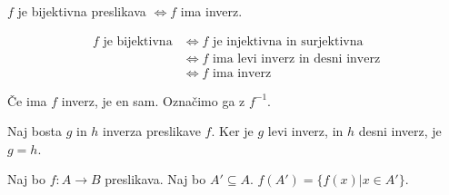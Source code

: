\begin{trditev}
    $f$ je bijektivna preslikava $\iff f$ ima inverz.
\end{trditev}
\begin{dokaz}
\begin{align*}
    f \text{ je bijektivna} &\iff f \text{ je injektivna in surjektivna} \\
    &\iff f \text{ ima levi inverz in desni inverz} \\
    &\iff f \text{ ima inverz}
\end{align*}
\end{dokaz}

\begin{trditev}
    Če ima $f$ inverz, je en sam.
    Označimo ga z $f^{-1}$.
\end{trditev}
\begin{dokaz}
Naj bosta $g$ in $h$ inverza preslikave $f$.
Ker je $g$ levi inverz, in $h$ desni inverz, je $g = h$.
\end{dokaz}

\begin{definicija}
    Naj bo $f: A \to B$ preslikava.
    Naj bo $A' \subseteq A$.
    $f(A') = \{f(x) | x \in A'\}$.
\end{definicija}

